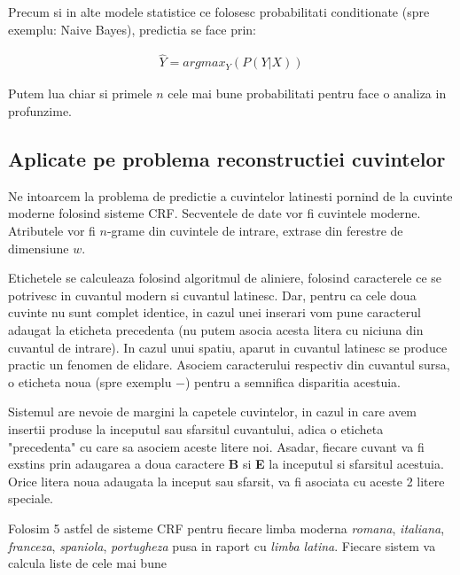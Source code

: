 Precum si in alte modele statistice ce folosesc probabilitati conditionate (spre exemplu: Naive Bayes),
predictia se face prin:

\begin{gather*}
  \hat{Y} = argmax_Y(P(Y|X))
\end{gather*}

Putem lua chiar si primele $n$ cele mai bune probabilitati pentru face o analiza in profunzime.

\subsection{Aplicate pe problema reconstructiei cuvintelor}
Ne intoarcem la problema de predictie a cuvintelor latinesti pornind de la cuvinte moderne folosind 
sisteme CRF. Secventele de date vor fi cuvintele moderne. Atributele vor fi $n$-grame din cuvintele
de intrare, extrase din ferestre de dimensiune $w$. 

Etichetele se calculeaza folosind algoritmul de aliniere, folosind caracterele ce se potrivesc in 
cuvantul modern si cuvantul latinesc. Dar, pentru ca cele doua cuvinte nu sunt complet identice,
in cazul unei inserari vom pune caracterul adaugat la eticheta precedenta (nu putem asocia acesta
litera cu niciuna din cuvantul de intrare). In cazul unui spatiu, aparut in cuvantul latinesc se 
produce practic un fenomen de elidare. Asociem caracterului respectiv din cuvantul sursa, o eticheta
noua (spre exemplu $-$) pentru a semnifica disparitia acestuia.

Sistemul are nevoie de margini la capetele cuvintelor, in cazul in care avem insertii produse la 
inceputul sau sfarsitul cuvantului, adica o eticheta "precedenta" cu care sa asociem aceste litere noi.
Asadar, fiecare cuvant va fi exstins prin adaugarea a doua caractere \textbf{B} si \textbf{E} la 
inceputul si sfarsitul acestuia.\cite{theone} Orice litera noua adaugata la inceput sau sfarsit, va
fi asociata cu aceste 2 litere speciale.


Folosim 5 astfel de sisteme CRF pentru fiecare limba moderna \textit{romana}, \textit{italiana}, 
\textit{franceza}, \textit{spaniola}, \textit{portugheza} pusa in raport cu \textit{limba latina}.
Fiecare sistem va calcula liste de cele mai bune 
